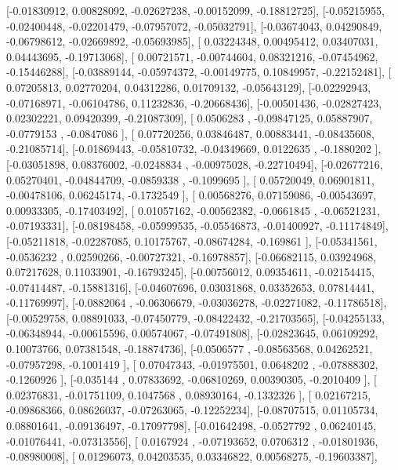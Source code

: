 \documentclass{article}
\begin{document}
       [-0.01830912,  0.00828092, -0.02627238, -0.00152099, -0.18812725],
       [-0.05215955, -0.02400448, -0.02201479, -0.07957072, -0.05032791],
       [-0.03674043,  0.04290849, -0.06798612, -0.02669892, -0.05693985],
       [ 0.03224348,  0.00495412,  0.03407031,  0.04443695, -0.19713068],
       [ 0.00721571, -0.00744604,  0.08321216, -0.07454962, -0.15446288],
       [-0.03889144, -0.05974372, -0.00149775,  0.10849957, -0.22152481],
       [ 0.07205813,  0.02770204,  0.04312286,  0.01709132, -0.05643129],
       [-0.02292943, -0.07168971, -0.06104786,  0.11232836, -0.20668436],
       [-0.00501436, -0.02827423,  0.02302221,  0.09420399, -0.21087309],
       [ 0.0506283 , -0.09847125,  0.05887907, -0.0779153 , -0.0847086 ],
       [ 0.07720256,  0.03846487,  0.00883441, -0.08435608, -0.21085714],
       [-0.01869443, -0.05810732, -0.04349669,  0.0122635 , -0.1880202 ],
       [-0.03051898,  0.08376002, -0.0248834 , -0.00975028, -0.22710494],
       [-0.02677216,  0.05270401, -0.04844709, -0.0859338 , -0.1099695 ],
       [ 0.05720049,  0.06901811, -0.00478106,  0.06245174, -0.1732549 ],
       [ 0.00568276,  0.07159086, -0.00543697,  0.00933305, -0.17403492],
       [ 0.01057162, -0.00562382, -0.0661845 , -0.06521231, -0.07193331],
       [-0.08198458, -0.05999535, -0.05546873, -0.01400927, -0.11174849],
       [-0.05211818, -0.02287085,  0.10175767, -0.08674284, -0.169861  ],
       [-0.05341561, -0.0536232 ,  0.02590266, -0.00727321, -0.16978857],
       [-0.06682115,  0.03924968,  0.07217628,  0.11033901, -0.16793245],
       [-0.00756012,  0.09354611, -0.02154415, -0.07414487, -0.15881316],
       [-0.04607696,  0.03031868,  0.03352653,  0.07814441, -0.11769997],
       [-0.0882064 , -0.06306679, -0.03036278, -0.02271082, -0.11786518],
       [-0.00529758,  0.08891033, -0.07450779, -0.08422432, -0.21703565],
       [-0.04255133, -0.06348944, -0.00615596,  0.00574067, -0.07491808],
       [-0.02823645,  0.06109292,  0.10073766,  0.07381548, -0.18874736],
       [-0.0506577 , -0.08563568,  0.04262521, -0.07957298, -0.1001419 ],
       [ 0.07047343, -0.01975501,  0.0648202 , -0.07888302, -0.1260926 ],
       [-0.035144  ,  0.07833692, -0.06810269,  0.00390305, -0.2010409 ],
       [ 0.02376831, -0.01751109,  0.1047568 ,  0.08930164, -0.1332326 ],
       [ 0.02167215, -0.09868366,  0.08626037, -0.07263065, -0.12252234],
       [-0.08707515,  0.01105734,  0.08801641, -0.09136497, -0.17097798],
       [-0.01642498, -0.0527792 ,  0.06240145, -0.01076441, -0.07313556],
       [ 0.0167924 , -0.07193652,  0.0706312 , -0.01801936, -0.08980008],
       [ 0.01296073,  0.04203535,  0.03346822,  0.00568275, -0.19603387],
\end{document}
